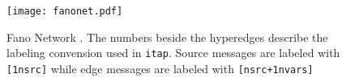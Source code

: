 \usepackage{graphicx}

 \begin{figure}
\texttt{[image: fanonet.pdf]}
\caption{Fano Network \cite{DFZMatroidNetworks}. The numbers beside the hyperedges describe the labeling convension used in \texttt{itap}. Source messages are labeled with \texttt{[1\hdots nsrc]} while edge messages are labeled with \texttt{[nsrc+1\hdots nvars]}}
\end{figure}

